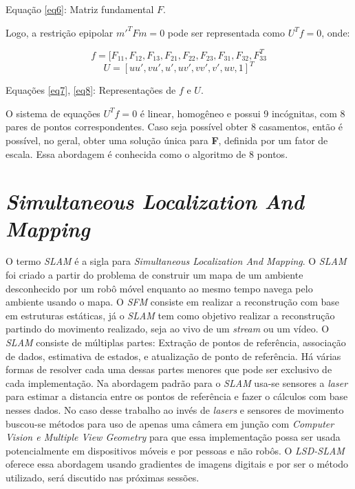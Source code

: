Equação \eqref{eq6}: Matriz fundamental $F$.

Logo, a restrição epipolar $m'^{T}Fm = 0$ pode ser representada como $U^{T}f = 0$, onde:

\begin{equation}\label{eq7}
f = [F_{11}, F_{12}, F_{13}, F_{21}, F_{22}, F_{23}, F_{31}, F_{32}, F_{33}^{T}
\end{equation}
\begin{equation}\label{eq8}
U = [uu', vu', u', uv', vv', v', uv,1]^{T}
\end{equation}

Equações \eqref{eq7}, \eqref{eq8}: Representações de $f$ e $U$.

O sistema de equações $U^{T}f = 0$ é linear, homogêneo e possui 9 incógnitas, com 8 pares de pontos correspondentes. Caso seja possível obter 8 casamentos, então é possível, no geral, obter uma solução única para \textbf{F}, definida por um fator de escala. Essa abordagem é conhecida como o algoritmo de 8 pontos.

\section{\textit{Simultaneous Localization And Mapping}}

O termo \textit{SLAM} é a sigla para \textit{Simultaneous Localization And Mapping}. O \textit{SLAM} foi criado a partir do problema de construir um mapa de um ambiente desconhecido por um robô móvel enquanto ao mesmo tempo navega pelo ambiente usando o mapa. O \textit{SFM} consiste em realizar a reconstrução com base em estruturas estáticas, já o \textit{SLAM} tem como objetivo realizar a reconstrução partindo do movimento realizado, seja ao vivo de um \textit{stream} ou um vídeo. O \textit{SLAM} consiste de múltiplas partes: Extração de pontos de referência, associação de dados, estimativa de estados, e atualização de ponto de referência. Há várias formas de resolver cada uma dessas partes menores que pode ser exclusivo de cada implementação\cite{SLAM-Dummies}. Na abordagem padrão para o \textit{SLAM} usa-se sensores a \textit{laser} para estimar a distancia entre os pontos de referência e fazer o cálculos com base nesses dados. No caso desse trabalho ao invés de \textit{lasers} e sensores de movimento buscou-se métodos para uso de apenas uma câmera em junção com \textit{Computer Vision e Multiple View Geometry} para que essa implementação possa ser usada potencialmente em dispositivos móveis e por pessoas e não robôs. O \textit{LSD-SLAM} oferece essa abordagem usando gradientes de imagens digitais e por ser o método utilizado, será discutido nas próximas sessões.



